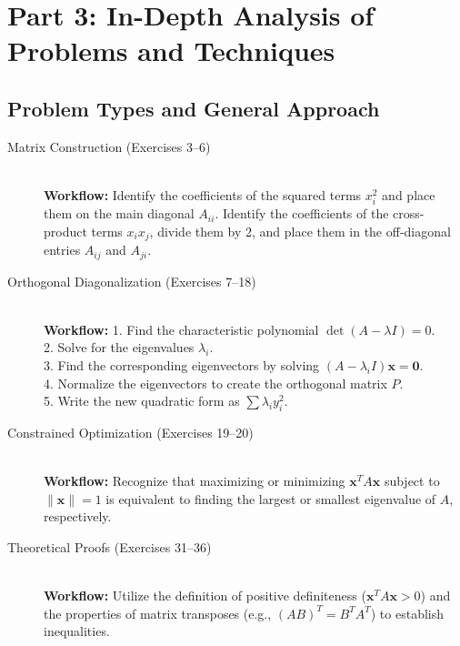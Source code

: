 \documentclass[11pt, letterpaper]{article}
\theoremstyle{definition}
\theoremstyle{remark}
\newcommand{\x}{\mathbf{x}}
\begin{document}
\newpage

\section{Part 3: In-Depth Analysis of Problems and Techniques}

\subsection{Problem Types and General Approach}
\begin{description}
    \item[Matrix Construction (Exercises 3--6)] \hfill \\
    \textbf{Workflow:} Identify the coefficients of the squared terms $x_i^2$ and place them on the main diagonal $A_{ii}$. Identify the coefficients of the cross-product terms $x_i x_j$, divide them by 2, and place them in the off-diagonal entries $A_{ij}$ and $A_{ji}$.
    
    \item[Orthogonal Diagonalization (Exercises 7--18)] \hfill \\
    \textbf{Workflow:} 
    1. Find the characteristic polynomial $\det(A - \lambda I) = 0$. \\
    2. Solve for the eigenvalues $\lambda_i$. \\
    3. Find the corresponding eigenvectors by solving $(A - \lambda_i I)\x = \mathbf{0}$. \\
    4. Normalize the eigenvectors to create the orthogonal matrix $P$. \\
    5. Write the new quadratic form as $\sum \lambda_i y_i^2$.
    
    \item[Constrained Optimization (Exercises 19--20)] \hfill \\
    \textbf{Workflow:} Recognize that maximizing or minimizing $\x^T A \x$ subject to $\|\x\| = 1$ is equivalent to finding the largest or smallest eigenvalue of $A$, respectively.
    
    \item[Theoretical Proofs (Exercises 31--36)] \hfill \\
    \textbf{Workflow:} Utilize the definition of positive definiteness ($\x^T A \x > 0$) and the properties of matrix transposes (e.g., $(AB)^T = B^T A^T$) to establish inequalities.
\end{description}
\end{document}

